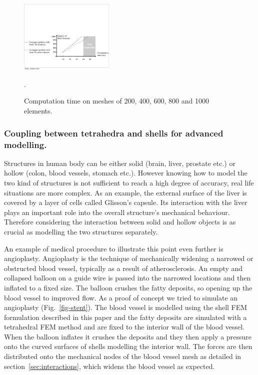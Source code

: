\documentclass{llncs}
\begin{document}
\begin{figure}
\centering
\includegraphics[height=3.5cm]{images/computation_time.pdf}
\caption {Computation time on meshes of 200, 400, 600, 800 and 1000 elements.}.
\label{fig-computation}
\end{figure}

\subsubsection{Coupling between tetrahedra and shells for advanced modelling.}
%
Structures in human body can be either solid (brain, liver, prostate etc.) or hollow (colon, blood vessels, stomach etc.). However knowing how to model the two kind of structures is not sufficient to reach a high degree of accuracy, real life situations are more complex. As an example, the external surface of the liver is covered by a layer of cells called Glisson's capsule. Its interaction with the liver plays an important role into the overall structure's mechanical behaviour. Therefore considering the interaction between solid and hollow objects is as crucial as modelling the two structures separately. 

An example of medical procedure to illustrate this point even further is angioplasty. Angioplasty is the technique of mechanically widening a narrowed or obstructed blood vessel, typically as a result of atherosclerosis. An empty and collapsed balloon on a guide wire is passed into the narrowed locations and then inflated to a fixed size. The balloon crushes the fatty deposits, so opening up the blood vessel to improved flow. As a proof of concept we tried to simulate an angioplasty (Fig.~\ref{fig-stent}). The blood vessel is modelled using the shell FEM formulation described in this paper and the fatty deposits are simulated with a tetrahedral FEM method and are fixed to the interior wall of the blood vessel. When the balloon inflates it crushes the deposits and they then apply a pressure onto the curved surfaces of shells modelling the interior wall. The forces are then distributed onto the mechanical nodes of the blood vessel mesh as detailed in section~\ref{sec:interactions}, which widens the blood vessel as expected. 
\end{document}
